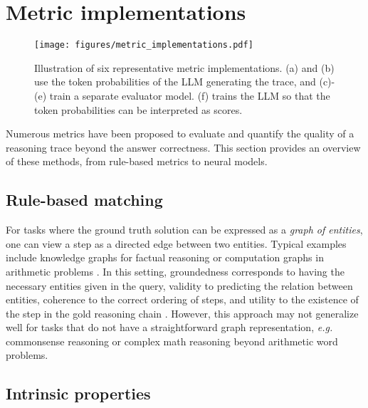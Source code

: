 \section{Metric implementations}
\label{sec:metric-implementations}

\begin{figure*}[tb]
    \centering
    \texttt{[image: figures/metric\_implementations.pdf]}
    \caption{Illustration of six representative metric implementations. (a) and (b) use the token probabilities of the LLM generating the trace, and (c)-(e) train a separate evaluator model. (f) trains the LLM so that the token probabilities can be interpreted as scores.}
    \label{fig:metric-implementations}
\end{figure*}



Numerous metrics have been proposed to evaluate and quantify the quality of a reasoning trace beyond the answer correctness. This section provides an overview of these methods, from rule-based metrics to neural models.

\subsection{Rule-based matching}

For tasks where the ground truth solution can be expressed as a \textit{graph of entities}, one can view a step as a directed edge between two entities. Typical examples include knowledge graphs for factual reasoning \citet{nguyen-etal-2024-direct} or computation graphs in arithmetic problems \citep{li-etal-2023-making}. In this setting, groundedness corresponds to having the necessary entities given in the query, validity to predicting the relation between entities, coherence to the correct ordering of steps, and utility to the existence of the step in the gold reasoning chain \citep{nguyen-etal-2024-direct, PrOntoQA}. However, this approach may not generalize well for tasks that do not have a straightforward graph representation, \textit{e.g.} commonsense reasoning or complex math reasoning beyond arithmetic word problems.


\subsection{Intrinsic properties}

